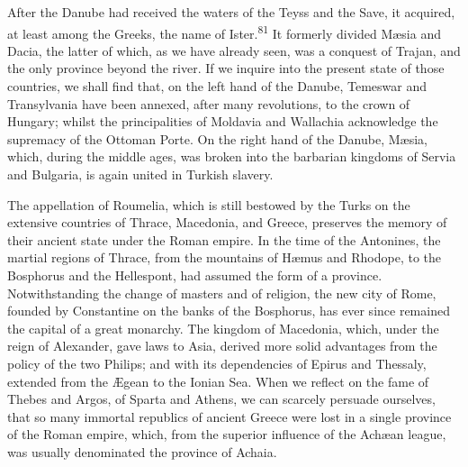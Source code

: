 
After the Danube had received the waters of the Teyss and the
Save, it acquired, at least among the Greeks, the name of Ister.\textsuperscript{81}
It formerly divided Mæsia and Dacia, the latter of which, as
we have already seen, was a conquest of Trajan, and the only
province beyond the river. If we inquire into the present state
of those countries, we shall find that, on the left hand of the
Danube, Temeswar and Transylvania have been annexed, after many
revolutions, to the crown of Hungary; whilst the principalities
of Moldavia and Wallachia acknowledge the supremacy of the
Ottoman Porte. On the right hand of the Danube, Mæsia, which,
during the middle ages, was broken into the barbarian kingdoms of
Servia and Bulgaria, is again united in Turkish slavery.


The appellation of Roumelia, which is still bestowed by the Turks
on the extensive countries of Thrace, Macedonia, and Greece,
preserves the memory of their ancient state under the Roman
empire. In the time of the Antonines, the martial regions of
Thrace, from the mountains of Hæmus and Rhodope, to the Bosphorus
and the Hellespont, had assumed the form of a province.
Notwithstanding the change of masters and of religion, the new
city of Rome, founded by Constantine on the banks of the
Bosphorus, has ever since remained the capital of a great
monarchy. The kingdom of Macedonia, which, under the reign of
Alexander, gave laws to Asia, derived more solid advantages from
the policy of the two Philips; and with its dependencies of
Epirus and Thessaly, extended from the Ægean to the Ionian Sea.
When we reflect on the fame of Thebes and Argos, of Sparta and
Athens, we can scarcely persuade ourselves, that so many immortal
republics of ancient Greece were lost in a single province of the
Roman empire, which, from the superior influence of the Achæan
league, was usually denominated the province of Achaia.

